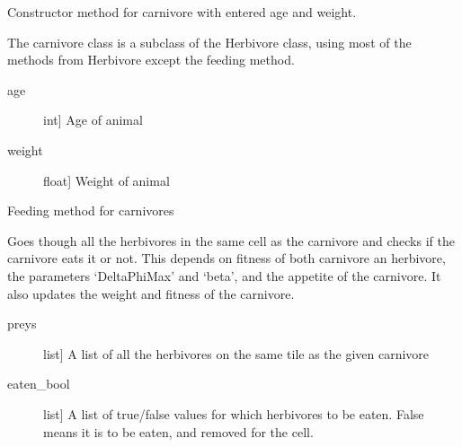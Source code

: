 \documentclass[a4paper,10pt,english]{sphinxmanual}
\begin{document}
\begin{fulllineitems}
\label{\detokenize{animals:biosim.animals.Carnivore}}
Constructor method for carnivore with entered age and weight.

The carnivore class is a subclass of the Herbivore class, using most of
the methods from Herbivore except the feeding method.
\begin{description}
\item[{age}] \leavevmode{[}int{]}
Age of animal

\item[{weight}] \leavevmode{[}float{]}
Weight of animal

\end{description}

\begin{fulllineitems}
\label{\detokenize{animals:biosim.animals.Carnivore.feeding}}
Feeding method for carnivores

Goes though all the herbivores in the same cell as the carnivore
and checks if the carnivore eats it or not. This depends on fitness of
both carnivore an herbivore, the parameters `DeltaPhiMax' and `beta',
and the appetite of the carnivore.
It also updates the weight and fitness of the carnivore.
\begin{description}
\item[{preys}] \leavevmode{[}list{]}
A list of all the herbivores on the same tile as the given carnivore

\end{description}
\begin{description}
\item[{eaten\_bool}] \leavevmode{[}list{]}
A list of true/false values for which herbivores to be eaten.
False means it is to be eaten, and removed for the cell.

\end{description}

\end{fulllineitems}


\end{fulllineitems}

\end{document}
